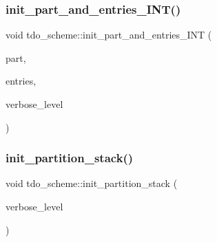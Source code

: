\subsubsection{\texorpdfstring{init\+\_\+part\+\_\+and\+\_\+entries\+\_\+\+I\+N\+T()}{init\_part\_and\_entries\_INT()}}
{\footnotesize\ttfamily void tdo\+\_\+scheme\+::init\+\_\+part\+\_\+and\+\_\+entries\+\_\+\+I\+NT (\begin{DoxyParamCaption}\item[{\mbox{\hyperlink{galois_8h_a09fddde158a3a20bd2dcadb609de11dc}{I\+NT}} $\ast$}]{part,  }\item[{\mbox{\hyperlink{galois_8h_a09fddde158a3a20bd2dcadb609de11dc}{I\+NT}} $\ast$}]{entries,  }\item[{\mbox{\hyperlink{galois_8h_a09fddde158a3a20bd2dcadb609de11dc}{I\+NT}}}]{verbose\+\_\+level }\end{DoxyParamCaption})}

\mbox{\label{classtdo__scheme_a88ee0be1cbf7309f0c5cfe96216c4b56}} 
\subsubsection{\texorpdfstring{init\+\_\+partition\+\_\+stack()}{init\_partition\_stack()}}
{\footnotesize\ttfamily void tdo\+\_\+scheme\+::init\+\_\+partition\+\_\+stack (\begin{DoxyParamCaption}\item[{\mbox{\hyperlink{galois_8h_a09fddde158a3a20bd2dcadb609de11dc}{I\+NT}}}]{verbose\+\_\+level }\end{DoxyParamCaption})}

\mbox{\label{classtdo__scheme_a6e96a46806b69b0dce089b38da19ddc8}} 

